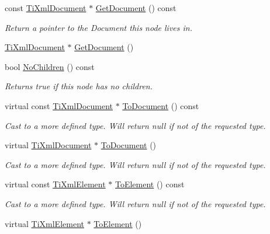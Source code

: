 \begin{DoxyCompactItemize}
const \hyperlink{classTiXmlDocument}{TiXmlDocument} $\ast$ \hyperlink{classTiXmlNode_aa66f4ebcd175204a168ed7c2d7b43071}{GetDocument} () const 
\begin{DoxyCompactList}\small\item\em Return a pointer to the Document this node lives in. \item\end{DoxyCompactList}\item 
\hyperlink{classTiXmlDocument}{TiXmlDocument} $\ast$ \hyperlink{classTiXmlNode_a7b2372c0e7adfb32f5b6902fe49a39b2}{GetDocument} ()
\item 
bool \hyperlink{classTiXmlNode_aeed21ad30630ef6e7faf096127edc9f3}{NoChildren} () const 
\begin{DoxyCompactList}\small\item\em Returns true if this node has no children. \item\end{DoxyCompactList}\item 
virtual const \hyperlink{classTiXmlDocument}{TiXmlDocument} $\ast$ \hyperlink{classTiXmlNode_a8a4cda4b15c29f64cff419309aebed08}{ToDocument} () const 
\begin{DoxyCompactList}\small\item\em Cast to a more defined type. Will return null if not of the requested type. \item\end{DoxyCompactList}\item 
virtual \hyperlink{classTiXmlDocument}{TiXmlDocument} $\ast$ \hyperlink{classTiXmlNode_a6a4c8ac28ee7a745d059db6691e03bae}{ToDocument} ()
\begin{DoxyCompactList}\small\item\em Cast to a more defined type. Will return null if not of the requested type. \item\end{DoxyCompactList}\item 
virtual const \hyperlink{classTiXmlElement}{TiXmlElement} $\ast$ \hyperlink{classTiXmlNode_a72abed96dc9667ab9e0a2a275301bb1c}{ToElement} () const 
\begin{DoxyCompactList}\small\item\em Cast to a more defined type. Will return null if not of the requested type. \item\end{DoxyCompactList}\item 
virtual \hyperlink{classTiXmlElement}{TiXmlElement} $\ast$ \hyperlink{classTiXmlNode_aa65d000223187d22a4dcebd7479e9ebc}{ToElement} ()

\end{DoxyCompactItemize}
